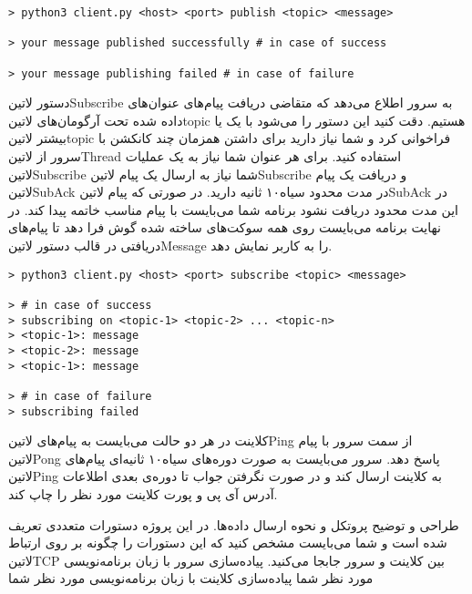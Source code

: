 \documentclass[]{article}
\begin{document}
  \begin{latin}
  \begin{verbatim}
> python3 client.py <host> <port> publish <topic> <message>

> your message published successfully # in case of success

> your message publishing failed # in case of failure
  \end{verbatim}
  \end{latin}

  دستور ‌لاتین{Subscribe} به سرور اطلاع می‌دهد که متقاضی دریافت پیام‌های عنوان‌های داده شده تحت آرگومان‌های ‌لاتین{topic} هستیم.
  دقت کنید این دستور را می‌شود با یک یا بیشتر ‌لاتین{topic} فراخوانی کرد و شما نیاز دارید برای داشتن همزمان چند کانکشن با سرور از ‌لاتین{Thread} استفاده کنید.
  برای هر عنوان شما نیاز به یک عملیات ‌لاتین{Subscribe} شما نیاز به ارسال یک پیام ‌لاتین{Subscribe} و دریافت یک پیام ‌لاتین{SubAck} در مدت محدود ‌سیاه{۱۰ ثانیه} دارید.
  در صورتی که پیام ‌لاتین{SubAck} در این مدت محدود دریافت نشود برنامه شما می‌بایست با پیام مناسب خاتمه پیدا کند.
  در نهایت برنامه می‌بایست روی همه سوکت‌های ساخته شده گوش فرا دهد تا پیام‌های دریافتی در قالب دستور ‌لاتین{Message} را به کاربر نمایش دهد.

  \begin{latin}
  \begin{verbatim}
> python3 client.py <host> <port> subscribe <topic> <message>

> # in case of success
> subscribing on <topic-1> <topic-2> ... <topic-n>
> <topic-1>: message
> <topic-2>: message
> <topic-1>: message

> # in case of failure
> subscribing failed
  \end{verbatim}
  \end{latin}



   کلاینت در هر دو حالت می‌بایست به پیام‌های ‌لاتین{Ping} از سمت سرور با پیام ‌لاتین{Pong} پاسخ دهد.
   سرور می‌بایست به صورت دوره‌های ‌سیاه{۱۰ ثانیه‌ای} پیام‌های ‌لاتین{Ping} به کلاینت ارسال کند و در صورت نگرفتن جواب تا دوره‌ی بعدی اطلاعات آدرس آی پی و پورت کلاینت مورد نظر را چاپ کند.


   طراحی و توضیح پروتکل و نحوه ارسال داده‌ها. در این پروژه دستورات متعددی تعریف شده است و شما می‌بایست مشخص کنید که این دستورات را چگونه بر روی ارتباط ‌لاتین{TCP} بین کلاینت و سرور جابجا می‌کنید.
   پیاده‌سازی سرور با زبان برنامه‌نویسی مورد نظر شما
   پیاده‌سازی کلاینت با زبان برنامه‌نویسی مورد نظر شما
\end{document}
